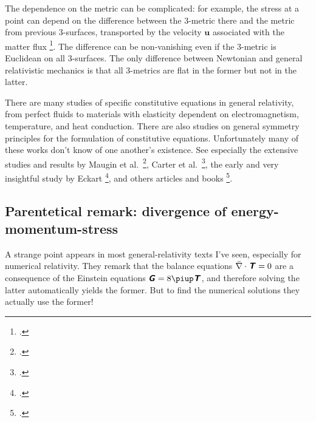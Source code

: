 \documentclass[\ifafour a4paper,12pt,\else a5paper,10pt,\fi%
onecolumn,oneside,article,%
british%
]{memoir}
\theoremstyle{remark}
\theoremstyle{innote}
\newcommand*{\mathte}[1]{\textbf{\textit{\textsf{#1}}}}
\newcommand*{\citep}{\footcites}
\newcommand*{\pu}{\piup}%
\renewcommand*{\|}[1][]{\nonscript\,#1\vert\nonscript\;\mathopen{}}
\newcommand*{\etal}{{et al.}}
\newcommand*{\ycc}{u}
\newcommand*{\yc}{\bm{\ycc}}
\newcommand*{\yGG}{G}
\newcommand*{\yG}{\mathte{\yGG}}
\newcommand*{\yTTf}{T}
\newcommand*{\yTf}{\mathte{\yTTf}}
\newcommand*{\ynaf}{\Bar{\nabla}}
\begin{document}
The dependence on the metric can be complicated: for example, the stress at
a point can depend on the difference between the 3-metric there and the
metric from previous 3-surfaces, transported by the velocity $\yc$
associated with the matter flux \citep{grotetal1966,carteretal1972}. The
difference can be non-vanishing even if the 3-metric is Euclidean on all
3-surfaces. The only difference between Newtonian and general relativistic
mechanics is that all 3-metrics are flat in the former but not in the
latter.

There are many studies of specific constitutive equations in general
relativity, from perfect fluids to materials with elasticity dependent on
electromagnetism, temperature, and heat conduction. There are also studies
on general symmetry principles for the formulation of constitutive
equations. Unfortunately many of these works don't know of one another's
existence. See especially the extensive studies and results by Maugin
\etal\
\citep{maugin1971,maugin1971b,mauginetal1972,mauginetal1972b,maugin1973,maugin1974,maugin1974b,maugin1978,maugin1978b,maugin1978c,maugin1978d,maugin1978e},
Carter \etal\ \citep{carteretal1972,carter1973,carteretal2006}, the early
and very insightful study by Eckart \citep{eckart1940c}, and others
articles and books
\citep{bressan1964b,lianis1973,bertottietal1984,hiscocketal1985,anileetal1989,gerochetal1991,herrmannetal2000,bossavit2001b,geroch2001,gourgoulhon2007_r2012,alcubierre2008,choquetbruhat2009,baumgarteetal2010,rezzollaetal2013,disconzi2014,pimenteletal2016,disconzietal2017}.



\subsection{Parentetical remark: divergence of energy-momentum-stress}
\label{sec:divergence_4stress}

A strange point appears in most general-relativity texts I've seen,
especially for numerical relativity. They remark that the balance equations
$\ynaf\cdot\yTf = 0$ are a consequence of the Einstein equations
$\yG = 8\pu \yTf$, and therefore solving the latter automatically yields
the former. But to find the numerical solutions they actually use the
former!
\end{document}
